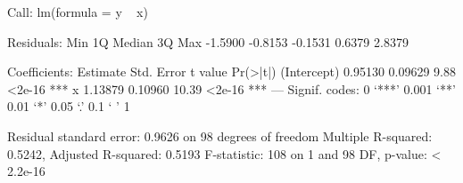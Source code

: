 
Call:
lm(formula = y ~ x)

Residuals:
    Min      1Q  Median      3Q     Max 
-1.5900 -0.8153 -0.1531  0.6379  2.8379 

Coefficients:
            Estimate Std. Error t value Pr(>|t|)    
(Intercept)  0.95130    0.09629    9.88   <2e-16 ***
x            1.13879    0.10960   10.39   <2e-16 ***
---
Signif. codes:  0 ‘***’ 0.001 ‘**’ 0.01 ‘*’ 0.05 ‘.’ 0.1 ‘ ’ 1

Residual standard error: 0.9626 on 98 degrees of freedom
Multiple R-squared:  0.5242,	Adjusted R-squared:  0.5193 
F-statistic:   108 on 1 and 98 DF,  p-value: < 2.2e-16

